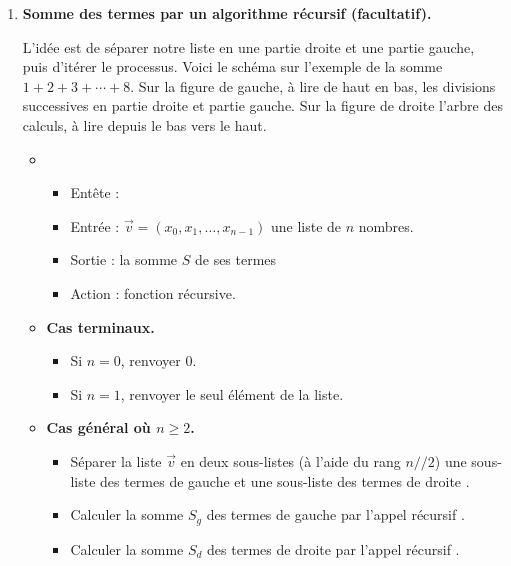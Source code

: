 \documentclass[11pt,class=report,crop=false]{standalone}
\begin{document}
\begin{activite}
\begin{enumerate}
      \item \textbf{Somme des termes par un algorithme récursif (facultatif).} 
    
      L'idée est de séparer notre liste en une partie droite et une partie gauche, puis d'itérer le processus. Voici le schéma sur l'exemple de la somme $1+2+3+\cdots+8$. Sur la figure de gauche, à lire de haut en bas, les divisions successives en partie droite et partie gauche. Sur la figure de droite l'arbre des calculs, à lire depuis le bas vers le haut.
      

\begin{algorithme}
\sauteligne 
\begin{itemize}
 
  \item 
  \begin{itemize}
    \item Entête : 
    \item Entrée : $\vec v  = (x_0,x_1,\ldots,x_{n-1})$ une liste de $n$ nombres.
    \item Sortie : la somme $S$ de ses termes
    \item Action : fonction récursive.
  \end{itemize} 
  
  \item \textbf{Cas terminaux.}
  \begin{itemize}
    \item Si $n=0$, renvoyer $0$.     
    \item Si $n=1$, renvoyer le seul élément de la liste.    
  \end{itemize}   
  
  \item \textbf{Cas général où $n\ge2$.}
  
 
  \begin{itemize}

    \item Séparer la liste $\vec v$ en deux sous-listes (à l'aide du rang $n//2$) une sous-liste des termes de gauche 
    et une sous-liste des termes de droite .
     
    \item Calculer la somme $S_g$ des termes de gauche par l'appel récursif .
    
    \item Calculer la somme $S_d$ des termes de droite par l'appel récursif .
    

\end{itemize}
\end{itemize}
\end{algorithme}
\end{enumerate}
\end{activite}
\end{document}
